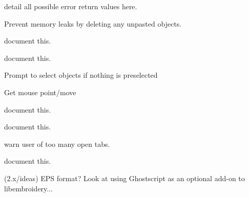 \begin{DoxyRefList}
\label{todo__todo000006}%
%
detail all possible error return values here.  
\item[Member \mbox{\hyperlink{imgui__main_8c_a5bc5a91adf26b18dd615c83c53483c77}{Main\+Window}} (void)]\label{todo__todo000198}%
%
Prevent memory leaks by deleting any unpasted objects.  
\item[Member \mbox{\hyperlink{imgui__main_8c_a7da395699da3193a09abcddf50c6fb9a}{messagebox\+\_\+action}} (void)]\label{todo__todo000124}%
%
document this.  
\item[Member \mbox{\hyperlink{imgui__main_8c_ada71768b2d9a4eef7469c9aff4d03db3}{mirror\+\_\+selected\+\_\+action}} (Emb\+Line line)]\label{todo__todo000162}%
%
document this.  
\item[Member \mbox{\hyperlink{imgui__main_8c_a55555197c724d3b2a543e87077876399}{move\+\_\+main}} (void)]\label{todo__todo000215}%
%
Prompt to select objects if nothing is preselected  
\item[Member \mbox{\hyperlink{imgui__main_8c_ab1b91aad20b1894b62be5cbc164f212b}{move\+\_\+selected\+\_\+action}} (void)]\label{todo__todo000159}%
%
Get mouse point/move  
\item[Member \mbox{\hyperlink{imgui__main_8c_a100e4694696c327bb497f71863c0c37e}{new\+\_\+file\+\_\+action}} (void)]\label{todo__todo000110}%
%
document this.  
\item[Member \mbox{\hyperlink{imgui__main_8c_a3e00a1cdbdae6386ce975f5f7c725245}{on\+\_\+window\+\_\+activated}} (void)]\label{todo__todo000020}%
%
document this.  
\item[Member \mbox{\hyperlink{imgui__main_8c_a608d581974072ba9dff1f601f0a97092}{open\+\_\+file\+\_\+action}} (int argc, char argv\mbox{[}10\mbox{]}\mbox{[}200\mbox{]})]\label{todo__todo000111}%
%
warn user of too many open tabs.  
\item[Member \mbox{\hyperlink{imgui__main_8c_aa2c0ece5dcf014611883ff57c4c90710}{open\+\_\+recent\+\_\+file}} (void)]\label{todo__todo000201}%
%
document this.  
\item[page \mbox{\hyperlink{index}{Overview}} ]\label{todo__todo000324}%
%
(2.\+x/ideas) EPS format? Look at using Ghostscript as an optional add-\/on to libembroidery...


\end{DoxyRefList}
